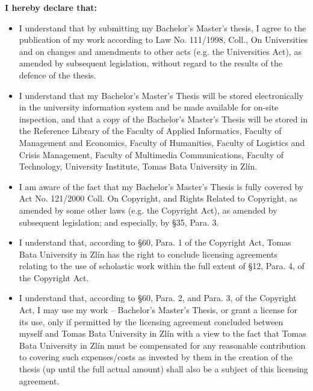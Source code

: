 {{			\else \ifenglish
					\textbf{I hereby declare that:}
					\begin{itemize}
						\setlength{\parskip}{0pt}
						\setlength{\itemsep}{0pt}
						\item{I understand that by submitting my \ifbp Bachelor's \else\ifdp Master's \fi\fi thesis, I agree to the publication of my work according to Law No. 111/1998, Coll., On Universities and on changes and amendments to other acts (e.g. the Universities Act), as amended by subsequent legislation, without regard to the results of the defence of the thesis.}
						\item{I understand that my \ifbp Bachelor's \else\ifdp Master's \fi\fi Thesis will be stored electronically in the university information system and be made available for on-site inspection, and that a copy of the \ifbp Bachelor's \else\ifdp Master's \fi\fi Thesis will be stored in the Reference Library of the
						            \iffai Faculty of Applied Informatics, \else\iffame Faculty of Management and Economics, \else \iffhs Faculty of Humanities, \else\ifflkr Faculty of Logistics and Crisis Management, \else\iffmk Faculty of Multimedia Communications, \else\ifft Faculty of Technology, \else\ifuni University Institute, \if \fi \fi \fi \fi \fi \fi \fi \fi Tomas Bata University in Zlín.}
						\item{I am aware of the fact that my \ifbp Bachelor's \else\ifdp Master's \fi\fi Thesis is fully covered by Act No. 121/2000 Coll. On Copyright, and Rights Related to Copyright, as amended by some other laws (e.g. the Copyright Act), as amended by subsequent legislation; and especially, by §35, Para. 3.}
						\item{I understand that, according to §60, Para. 1 of the Copyright Act, Tomas Bata University in Zlín has the right to conclude licensing agreements relating to the use of scholastic work within the full extent of §12, Para. 4, of the Copyright Act.}
						\item{I understand that, according to §60, Para. 2, and Para. 3, of the Copyright Act, I may use my work – \ifbp Bachelor's \else\ifdp Master's \fi\fi Thesis, or grant a license for its use, only if permitted by the licensing agreement concluded between myself and Tomas Bata University in Zlín with a view to the fact that Tomas Bata University in Zlín must be compensated for any reasonable contribution to covering such expenses/costs as invested by them in the creation of the thesis (up until the full actual amount) shall also be a subject of this licensing agreement.}

\end{itemize}}}
